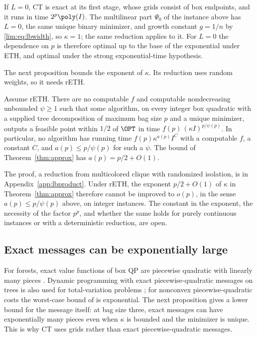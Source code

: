 If $L=0$, CT is exact at its first stage, whose grids consist of box
endpoints, and it runs in time $2^p\poly(I)$. The multilinear part $\Psi_0$
of the instance above has $L=0$, the same unique binary minimizer, and growth
constant $g=1/n$ by \eqref{lim:eq:lbwidth}, so $\kappa=1$; the same reduction
applies to it. For $L=0$ the dependence on $p$ is therefore optimal up to the
base of the exponential under ETH, and optimal under the strong
exponential-time hypothesis.

The next proposition bounds the exponent of $\kappa$. Its reduction uses
random weights, so it needs rETH.

\begin{proposition}
\label{prop:lbproduct}
Assume rETH. There are no computable $f$ and computable nondecreasing
unbounded $\psi\ge1$ such that some algorithm, on every integer box quadratic
with a supplied tree decomposition of maximum bag size $p$ and a unique
minimizer, outputs a feasible point within $1/2$ of $\OPT$ in time
$f(p)\,(\kappa I)^{p/\psi(p)}$. In particular, no algorithm has running time
$f(p)\kappa^{a(p)}I^C$ with a computable $f$, a constant $C$, and
$a(p)\le p/\psi(p)$ for such a $\psi$. The bound of
Theorem~\ref{thm:approx} has $a(p)=p/2+O(1)$.
\end{proposition}

The proof, a reduction from multicolored clique with randomized isolation,
is in Appendix~\ref{app:lbproduct}. Under rETH, the exponent $p/2+O(1)$ of
$\kappa$ in Theorem~\ref{thm:approx} therefore cannot be improved to $o(p)$,
in the sense $a(p)\le p/\psi(p)$ above, on integer instances. The constant in the
exponent, the necessity of the factor $p^p$, and whether the same holds for
purely continuous instances or with a deterministic reduction, are open.

\subsection{Exact messages can be exponentially large}
\label{sec:limits-messages}

For forests, exact value functions of box QP are piecewise quadratic with
linearly many pieces \cite{DelPiaKhajavirad2026}. Dynamic programming with
exact piecewise-quadratic messages on trees is also used for total-variation
problems \cite{KolmogorovPockRolinek2016,KuricAhmetspahicPock2024}; for
nonconvex piecewise-quadratic costs the worst-case bound of
\cite{KuricAhmetspahicPock2024} is exponential. The next proposition gives a
lower bound for the message itself: at bag size three, exact messages can have
exponentially many pieces even when $\kappa$ is bounded and the minimizer is
unique. This is why CT uses grids rather than exact piecewise-quadratic
messages.

